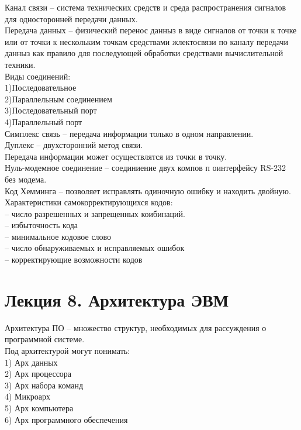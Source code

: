 \documentclass[a4paper, 12pt]{article}
\begin{document}
Канал связи -- система технических средств и среда распространения сигналов для односторонней передачи данных.\\

Передача данных -- физический перенос данныз в виде сигналов от точки к точке или от точки к нескольким точкам средствами жлектосвязи по каналу передачи данныз как правило для последующей обработки средствами вычислительной техники.\\

Виды соединений:\\
1)Последовательное\\
2)Параллельным соединением\\
3)Последовательный порт\\
4)Параллельный порт\\

Симплекс связь -- передача информации только в одном направлении.\\

Дуплекс -- двухсторонний метод связи.\\


Передача информации может осуществлятся из точки в точку.\\
Нуль-модемное соединение -- соединиение двух компов п оинтерфейсу RS-232 без модема.\\


Код Хемминга -- позволяет исправлять одиночную ошибку и находить двойную.\\

Характеристики самокорректирующихся кодов:\\
-- число разрешенных и запрещенных коибинаций.\\
-- избыточность кода\\
-- минимальное кодовое слово\\
-- число обнаруживаемых и исправляемых ошибок\\
-- корректирующие возможности кодов\\

\section*{Лекция 8. Архитектура ЭВМ}
Архитектура ПО -- множество структур, необходимых для рассуждения о программной системе.\\

Под архитектурой могут понимать:\\
1) Арх данных\\
2) Арх процессора\\
3) Арх набора команд\\
4) Микроарх\\
5) Арх компьютера\\
6) Арх программного обеспечения\\
\end{document}
